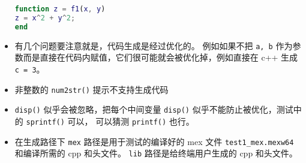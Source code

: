 \begin{itemize}
\begin{lstlisting}[language=matlab,caption=test1.m]
% 子函数
function z = f1(x, y)
z = x^2 + y^2;
end
\end{lstlisting}
\item 有几个问题要注意就是，代码生成是经过优化的。 例如如果不把 \verb`a, b` 作为参数而是直接在代码内赋值，它们很可能就会被优化掉，例如直接在 c++ 生成 \verb`c = 3`。
\item 非整数的 \verb`num2str()` 提示不支持生成代码
\item \verb`disp()` 似乎会被忽略，把每个中间变量 \verb`disp()` 似乎不能防止被优化，测试中的 \verb`sprintf()` 可以， 可以猜测 \verb`printf()` 也行。
\item 在生成路径下 \verb`mex` 路径是用于测试的编译好的 mex 文件 \verb`test1_mex.mexw64` 和编译所需的 cpp 和头文件。 \verb`lib` 路径是给终端用户生成的 cpp 和头文件。
\end{itemize}
